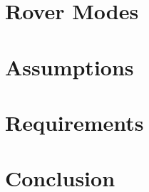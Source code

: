 \section{Rover Modes}
\label{sec:RequirementsAndDesignDrivers:RoverModes}

\section{Assumptions}
\label{sec:RequirementsAndDesignDrivers:Assumptions}

\section{Requirements}
\label{sec:RequirementsAndDesignDrivers:Requirements}

\section{Conclusion}
\label{sec:RequirementsAndDesignDrivers:Conclusion}
